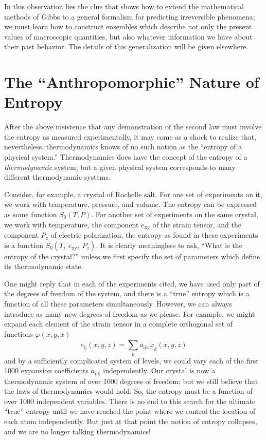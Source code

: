 \documentclass[twocolumn]{article}
\begin{document}
In this observation lies the clue that shows how to extend the
mathematical methods of Gibbs to a general formalism for predicting
irreversible phenomena; we must learn how to construct ensembles which
describe not only the present values of macroscopic quantities, but also
whatever information we have about their past behavior. The details of
this generalization will be given elsewhere.

\section{The ``Anthropomorphic'' Nature of Entropy}\label{sec-the-anthropomorphic-nature-of-entropy}

After the above insistence that any demonstration of the second law must
involve the entropy as measured experimentally, it may come as a shock
to realize that, nevertheless, thermodynamics knows of no such notion as
the ``entropy of a physical system.'' Thermodynamics does have the
concept of the entropy of a \emph{thermodynamic} system; but a given
physical system corresponds to many different thermodynamic systems.

Consider, for example, a crystal of Rochelle salt. For one set of
experiments on it, we work with temperature, pressure, and volume. The
entropy can be expressed as some function \(S_{0}(T,P)\). For another
set of experiments on the same crystal, we work with temperature, the
component \(e_{\text{xy}}\) of the strain tensor, and the component
\(P_{z}\) of electric polarization; the entropy as found in these
experiments is a function \(S_{0}(T,\ e_{\text{xy}},\ P_{z})\). It is
clearly meaningless to ask, ``What is the entropy of the crystal?''
unless we first specify the set of parameters which define its
thermodynamic state.

One might reply that in each of the experiments cited, we have used only
part of the degrees of freedom of the system, and there is a ``true''
entropy which is a function of all these parameters simultaneously.
However, we can always introduce as many new degrees of freedom as we
please. For example, we might expand each element of the strain tensor
in a complete orthogonal set of functions \(\varphi(x,y,x)\)
%
\[
e_{\text{ij}}\left( x,y,z \right) = \sum_{k}^{}{a_{\text{ijk}}\varphi_{k}(x,y,z)}
\]
%
and by a sufficiently complicated system of levels, we could vary each
of the first 1000 expansion coefficients \(a_{\text{ijk}}\)
independently. Our crystal is now a thermodynamic system of over 1000
degrees of freedom; but we still believe that the laws of thermodynamics
would hold. So, the entropy must be a function of over 1000 independent
variables. There is no end to this search for the ultimate ``true''
entropy until we have reached the point where we control the location of
each atom independently. But just at that point the notion of entropy
collapses, and we are no longer talking thermodynamics!
\end{document}
